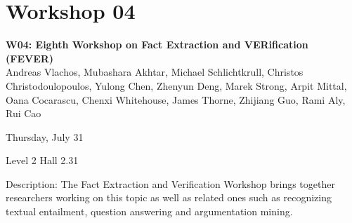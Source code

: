 \clearpage


\section[W04: Eighth Workshop on Fact Extraction and VERification (FEVER)]{Workshop 04}
\label{workshop_4}

\begin{center}
    {\Large \textbf{W04: Eighth Workshop on Fact Extraction and VERification (FEVER)}}\\

    Andreas Vlachos, Mubashara Akhtar, Michael Schlichtkrull, Christos Christodoulopoulos, Yulong Chen, Zhenyun Deng, Marek Strong, Arpit Mittal, Oana Cocarascu, Chenxi Whitehouse, James Thorne, Zhijiang Guo, Rami Aly, Rui Cao

     Thursday, July 31
    
    Level 2 Hall 2.31

\end{center}

Description: The Fact Extraction and Verification Workshop brings together researchers working on this topic as well as related ones such as recognizing textual entailment, question answering and argumentation mining.

